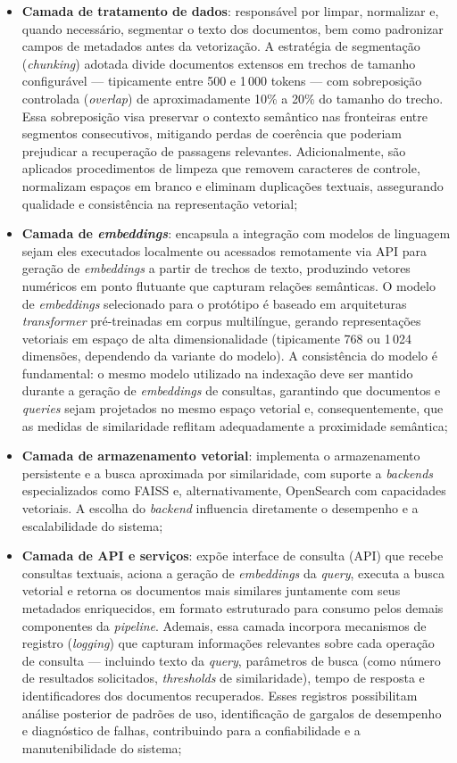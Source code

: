 \begin{itemize}
  \item \textbf{Camada de tratamento de dados}: responsável por limpar, normalizar e, quando necessário, segmentar o texto dos documentos, bem como padronizar campos de metadados antes da vetorização. A estratégia de segmentação (\textit{chunking}) adotada divide documentos extensos em trechos de tamanho configurável --- tipicamente entre 500 e 1\,000 tokens --- com sobreposição controlada (\textit{overlap}) de aproximadamente 10\% a 20\% do tamanho do trecho. Essa sobreposição visa preservar o contexto semântico nas fronteiras entre segmentos consecutivos, mitigando perdas de coerência que poderiam prejudicar a recuperação de passagens relevantes. Adicionalmente, são aplicados procedimentos de limpeza que removem caracteres de controle, normalizam espaços em branco e eliminam duplicações textuais, assegurando qualidade e consistência na representação vetorial;
  \item \textbf{Camada de \textit{embeddings}}: encapsula a integração com modelos de linguagem sejam eles executados localmente ou acessados remotamente via API  para geração de \textit{embeddings} a partir de trechos de texto, produzindo vetores numéricos em ponto flutuante que capturam relações semânticas. O modelo de \textit{embeddings} selecionado para o protótipo é baseado em arquiteturas \textit{transformer} pré-treinadas em corpus multilíngue, gerando representações vetoriais em espaço de alta dimensionalidade (tipicamente 768 ou 1\,024 dimensões, dependendo da variante do modelo). A consistência do modelo é fundamental: o mesmo modelo utilizado na indexação deve ser mantido durante a geração de \textit{embeddings} de consultas, garantindo que documentos e \textit{queries} sejam projetados no mesmo espaço vetorial e, consequentemente, que as medidas de similaridade reflitam adequadamente a proximidade semântica;
  \item \textbf{Camada de armazenamento vetorial}: implementa o armazenamento persistente e a busca aproximada por similaridade, com suporte a \textit{backends} especializados como FAISS e, alternativamente, OpenSearch com capacidades vetoriais. A escolha do \textit{backend} influencia diretamente o desempenho e a escalabilidade do sistema;
  \item \textbf{Camada de API e serviços}: expõe interface de consulta (API) que recebe consultas textuais, aciona a geração de \textit{embeddings} da \textit{query}, executa a busca vetorial e retorna os documentos mais similares juntamente com seus metadados enriquecidos, em formato estruturado para consumo pelos demais componentes da \textit{pipeline}. Ademais, essa camada incorpora mecanismos de registro (\textit{logging}) que capturam informações relevantes sobre cada operação de consulta --- incluindo texto da \textit{query}, parâmetros de busca (como número de resultados solicitados, \textit{thresholds} de similaridade), tempo de resposta e identificadores dos documentos recuperados. Esses registros possibilitam análise posterior de padrões de uso, identificação de gargalos de desempenho e diagnóstico de falhas, contribuindo para a confiabilidade e a manutenibilidade do sistema;

\end{itemize}
